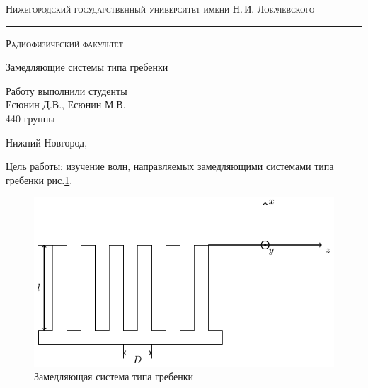 \documentclass[a4paper,14pt]{extarticle}
\def\labauthors{Есюнин Д.В., Есюнин М.В.}
\def\labtheme{Замедляющие системы типа гребенки}
\begin{document}
	\begin{titlepage}

		\begin{center}
			
			
			\textsc{Нижегородский государственный университет имени Н.\,И. Лобачевского}
			\vskip 4pt \hrule \vskip 8pt
			\textsc{Радиофизический факультет}
			
			\vfill
			
			{\Large\labtheme}
			
		\end{center}
		
		\vfill
		
		\begin{flushright}
			{Работу выполнили студенты\\ \labauthors\\ 440 группы}
		\end{flushright}
		
		\vfill
		
		\begin{center}
			Нижний Новгород, \the\year
		\end{center}
	\end{titlepage}
	\newpage 
Цель работы: изучение волн, направляемых замедляющими системами типа гребенки рис.\ref{pic1}.
	\begin{figure}[H]
		\centering
		\includegraphics[width=\linewidth]{plots/pic1}
		\caption{Замедляющая система типа гребенки}
		\label{pic1}
	\end{figure}
\end{document}
